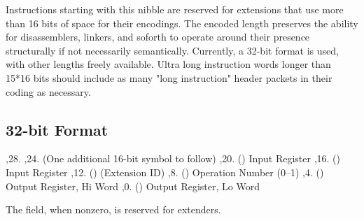 Instructions starting with this nibble are reserved for extensions that use more than
16 bits of space for their encodings. The encoded length preserves the ability
for disassemblers, linkers, and soforth to operate around their presence structurally
if not necessarily semantically. Currently, a 32-bit format is used, with other
lengths freely available. Ultra long instruction words longer than 15*16 bits should
include as many "long instruction" header packets in their coding as necessary.

\subsection{32-bit Format}

\li \ins{},28. 
\li \ins{},24.  (One additional 16-bit symbol to follow)
\li \ins{},20. () Input Register
\li \ins{},16. () Input Register
\li \ins{},12. ()  (Extension ID)
\li \ins{},8. () Operation Number (0--1)
\li \ins{},4. () Output Register, Hi Word
\li \ins{},0. () Output Register, Lo Word

The  field, when nonzero, is reserved for extenders.

\bigskip
{
	\offinterlineskip
}
\bigskip

\maybye